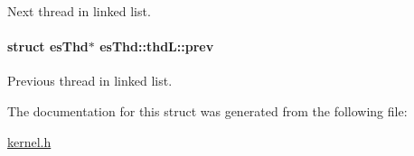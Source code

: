 Next thread in linked list. 

\hypertarget{structesThd_1_1thdL_ae7fe28e0efdcae499fa53431065b1a43}{
\paragraph[{prev}]{\setlength{\rightskip}{0pt plus 5cm}struct {\bf es\-Thd}$\ast$ es\-Thd\-::thd\-L\-::prev}}\label{structesThd_1_1thdL_ae7fe28e0efdcae499fa53431065b1a43}


Previous thread in linked list. 



The documentation for this struct was generated from the following file\-:\begin{DoxyCompactItemize}
\item 
\hyperlink{kernel_8h}{kernel.\-h}\end{DoxyCompactItemize}
